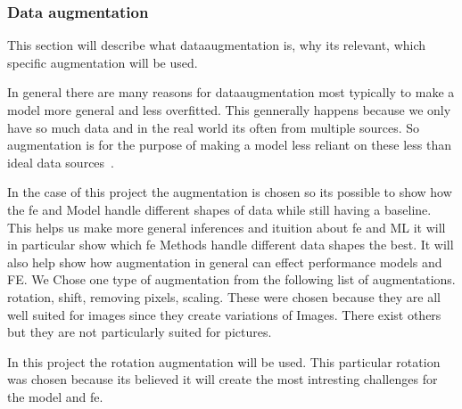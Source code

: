 \subsubsection{Data augmentation}\label{subsec:data-augmentation}
This section will describe what dataaugmentation is, why its relevant, which specific augmentation will be used.



In general there are many reasons for dataaugmentation most typically to make a model more general and less overfitted. This gennerally happens because we only have so much data and in the real world its often from multiple sources. So augmentation is for the purpose of making a model less reliant on these less than ideal data sources~\cite{MAHARANA202291}.

In the case of this project the augmentation is chosen so its possible to show how the \gls{fe} and Model handle different shapes of data while still having a baseline. This helps us make more general inferences and ituition about \gls{fe} and ML it will in particular show which \gls{fe} Methods handle different data shapes the best. It will also help show how augmentation in general can effect performance models  and FE.
We Chose one type of augmentation from the following list of augmentations. rotation, shift, removing pixels, scaling. These were chosen because they are all well suited for images since they create variations of Images. There exist others but they are not particularly suited for pictures. 

In this project the rotation augmentation will be used. This particular rotation was chosen because its believed it will create the most intresting challenges for the model and \gls{fe}.


